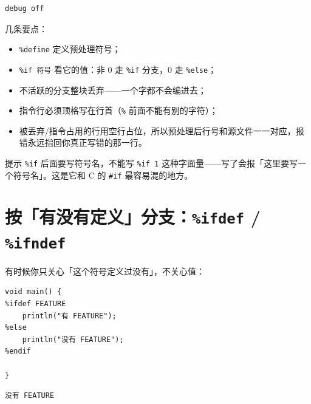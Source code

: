 \par
\medskip
\begin{lstlisting}[style=out]
debug off
\end{lstlisting}
\par
\medskip

几条要点：

\begin{itemize}

\item \texttt{\%define} 定义预处理符号；

\item \texttt{\%if 符号} 看它的值：非 0 走 \texttt{\%if} 分支，0 走 \texttt{\%else}；

\item 不活跃的分支整块丢弃——一个字都不会编进去；

\item 指令行必须顶格写在行首（\texttt{\%} 前面不能有别的字符）；

\item 被丢弃/指令占用的行用空行占位，所以预处理后行号和源文件一一对应，报错永远指回你真正写错的那一行。

\end{itemize}

\begin{tip}{提示}
\texttt{\%if} 后面要写符号名，不能写 \texttt{\%if 1} 这种字面量——写了会报「这里要写一个符号名」。这是它和 C 的 \texttt{\#if} 最容易混的地方。
\end{tip}

\section{按「有没有定义」分支：\texttt{\%ifdef} / \texttt{\%ifndef}}

有时候你只关心「这个符号定义过没有」，不关心值：

\par
\medskip
\begin{lstlisting}[style=chali]
void main() {
%ifdef FEATURE
    println("有 FEATURE");
%else
    println("没有 FEATURE");
%endif

}
\end{lstlisting}
\par
\medskip

\par
\medskip
\begin{lstlisting}[style=out]
没有 FEATURE
\end{lstlisting}
\par
\medskip

